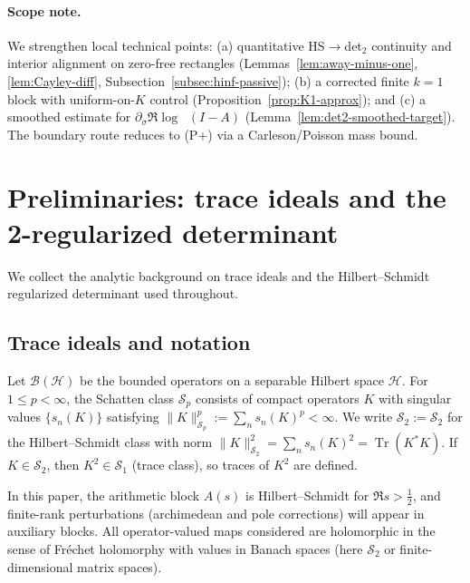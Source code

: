\documentclass[11pt]{article}
\theoremstyle{remark}
\newcommand{\HS}{\mathcal{S}_2}
\DeclareMathOperator{\Tr}{Tr}
\DeclareMathOperator{\dettwo}{det_2}
\begin{document}
\paragraph{Scope note.} We strengthen local technical points: (a) quantitative HS$\to$det$_2$ continuity and interior alignment on zero-free rectangles (Lemmas~\ref{lem:away-minus-one}, \ref{lem:Cayley-diff}, Subsection~\ref{subsec:hinf-passive}); (b) a corrected finite $k{=}1$ block with uniform-on-$K$ control (Proposition~\ref{prop:K1-approx}); and (c) a smoothed estimate for $\partial_\sigma\Re\log\dettwo(I-A)$ (Lemma~\ref{lem:det2-smoothed-target}). The boundary route reduces to (P+) via a Carleson/Poisson mass bound.

\section{Preliminaries: trace ideals and the 2-regularized determinant}
We collect the analytic background on trace ideals and the Hilbert--Schmidt regularized determinant used throughout.

\subsection{Trace ideals and notation}
Let \(\mathcal{B}(\mathcal{H})\) be the bounded operators on a separable Hilbert space \(\mathcal{H}\). For \(1\le p<\infty\), the Schatten class \(\mathcal{S}_p\) consists of compact operators \(K\) with singular values \(\{s_n(K)\}\) satisfying \(\|K\|_{\mathcal{S}_p}^p:=\sum_n s_n(K)^p<\infty\). We write \(\HS:=\mathcal{S}_2\) for the Hilbert--Schmidt class with norm \(\|K\|_{\HS}^2=\sum_n s_n(K)^2=\Tr(K^*K)\). If \(K\in\HS\), then \(K^2\in \mathcal{S}_1\) (trace class), so traces of \(K^2\) are defined.

In this paper, the arithmetic block \(A(s)\) is Hilbert--Schmidt for \(\Re s>\tfrac12\), and finite-rank perturbations (archimedean and pole corrections) will appear in auxiliary blocks. All operator-valued maps considered are holomorphic in the sense of Fr\'echet holomorphy with values in Banach spaces (here \(\HS\) or finite-dimensional matrix spaces).
\end{document}

